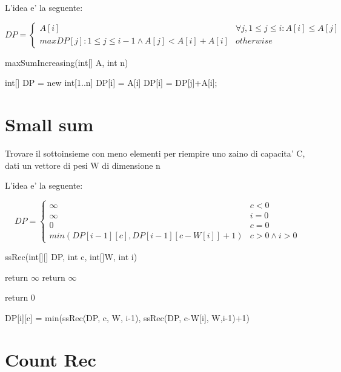 \documentclass[oneside]{book}
\begin{document}
L'idea e' la seguente:

\begin{equation}
  DP =
    \begin{cases}
      A[i] & \forall j, 1 \leq j \leq i : A[i] \leq A[j]\\
      max{DP[j]: 1 \leq j \leq i-1 \land A[j] < A[i]}+A[i] & otherwise      
    \end{cases}       
\end{equation}
\begin{algorithm}
\caption{maxSumIncreasing(int[] A, int n)\label{alg:cap}}
\begin{algorithmic}
\State int[] DP = new int[1..n]
	\State DP[i] = A[i]
			\State DP[i] = DP[j]+A[i];
		\EndIf
	\EndFor

\EndFor
\end{algorithmic}
\end{algorithm}
\newpage
\section{Small sum}
Trovare il sottoinsieme con meno elementi per riempire uno zaino di capacita' C, dati un vettore di pesi W di dimensione n

L'idea e' la seguente:

\begin{equation}
DP = 
	\begin{cases}
		\infty & c < 0 \\
		\infty & i = 0\\
		0 & c = 0 \\
		min(DP[i-1][c],DP[i-1][c-W[i]]+1) & c > 0 \land i > 0
	\end{cases}
\end{equation}

\begin{algorithm}
\caption{ssRec(int[][] DP, int c, int[]W, int i)\label{alg:cap}}
\begin{algorithmic}
	\State return $\infty$
	\State return $\infty$

	\State return 0

\Else
		\State DP[i][c] = min(ssRec(DP, c, W, i-1), ssRec(DP, c-W[i], W,i-1)+1)
	\EndIf
\EndIf
\end{algorithmic}
\end{algorithm}

\section{Count Rec}
\end{document}
